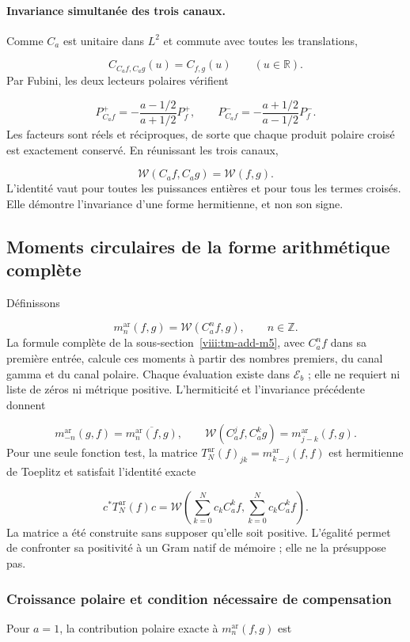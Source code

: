 \paragraph{Invariance simultanée des trois canaux.}
\label{viii:tm-add:invariancia-weil} Comme \(C_a\) est unitaire dans \(L^2\) et commute avec toutes les translations,

\[
C_{C_af,C_ag}(u)=C_{f,g}(u)\qquad(u\in\mathbb R).
\]
Par Fubini, les deux lecteurs polaires vérifient

\[
P_{C_af}^+=-\frac{a-1/2}{a+1/2}P_f^+,
\qquad
P_{C_af}^-=-\frac{a+1/2}{a-1/2}P_f^-.
\]
Les facteurs sont réels et réciproques, de sorte que chaque produit polaire croisé est exactement conservé. En réunissant les trois canaux,

\[
\boxed{\mathscr W(C_af,C_ag)=\mathscr W(f,g).}
\]
L'identité vaut pour toutes les puissances entières et pour tous les termes croisés. Elle démontre l'invariance d'une forme hermitienne, et non son signe.


\subsection{Moments circulaires de la forme arithmétique complète}
\label{viii:tm-add-m6}
Définissons

\[
m_n^{\mathrm{ar}}(f,g)=\mathscr W(C_a^n f,g),\qquad n\in\mathbb Z.
\]
La formule complète de la sous-section~\ref{viii:tm-add-m5}, avec \(C_a^nf\) dans sa première entrée, calcule ces moments à partir des nombres premiers, du canal gamma et du canal polaire. Chaque évaluation existe dans \(\mathscr E_b\) ; elle ne requiert ni liste de zéros ni métrique positive. L'hermiticité et l'invariance précédente donnent

\[
m_{-n}^{\mathrm{ar}}(g,f)=\overline{m_n^{\mathrm{ar}}(f,g)},\qquad
\mathscr W(C_a^j f,C_a^k g)=m_{j-k}^{\mathrm{ar}}(f,g).
\]
Pour une seule fonction test, la matrice \(T_N^{\mathrm{ar}}(f)_{jk}=m_{k-j}^{\mathrm{ar}}(f,f)\) est hermitienne de Toeplitz et satisfait l'identité exacte

\[
c^*T_N^{\mathrm{ar}}(f)c
=\mathscr W\!\left(\sum_{k=0}^N c_k C_a^k f,
                    \sum_{k=0}^N c_k C_a^k f\right).
\]
La matrice a été construite sans supposer qu'elle soit positive. L'égalité permet de confronter sa positivité à un Gram natif de mémoire ; elle ne la présuppose pas.


\subsubsection{Croissance polaire et condition nécessaire de compensation}
\label{viii:tm-add-m6-1}
Pour \(a=1\), la contribution polaire exacte à \(m_n^{\mathrm{ar}}(f,g)\) est

